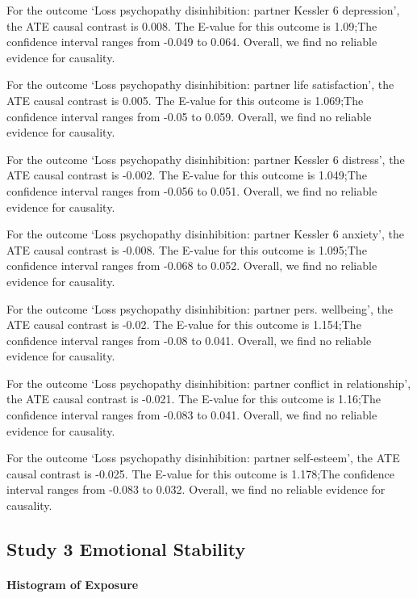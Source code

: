 \documentclass[
  singlecolumn]{article}
\let\oldparagraph\paragraph
\renewcommand{\paragraph}[1]{\oldparagraph{#1}\mbox{}}
\begin{document}
For the outcome `Loss psychopathy disinhibition: partner Kessler 6
depression', the ATE causal contrast is 0.008. The E-value for this
outcome is 1.09;The confidence interval ranges from -0.049 to 0.064.
Overall, we find no reliable evidence for causality.

For the outcome `Loss psychopathy disinhibition: partner life
satisfaction', the ATE causal contrast is 0.005. The E-value for this
outcome is 1.069;The confidence interval ranges from -0.05 to 0.059.
Overall, we find no reliable evidence for causality.

For the outcome `Loss psychopathy disinhibition: partner Kessler 6
distress', the ATE causal contrast is -0.002. The E-value for this
outcome is 1.049;The confidence interval ranges from -0.056 to 0.051.
Overall, we find no reliable evidence for causality.

For the outcome `Loss psychopathy disinhibition: partner Kessler 6
anxiety', the ATE causal contrast is -0.008. The E-value for this
outcome is 1.095;The confidence interval ranges from -0.068 to 0.052.
Overall, we find no reliable evidence for causality.

For the outcome `Loss psychopathy disinhibition: partner pers.
wellbeing', the ATE causal contrast is -0.02. The E-value for this
outcome is 1.154;The confidence interval ranges from -0.08 to 0.041.
Overall, we find no reliable evidence for causality.

For the outcome `Loss psychopathy disinhibition: partner conflict in
relationship', the ATE causal contrast is -0.021. The E-value for this
outcome is 1.16;The confidence interval ranges from -0.083 to 0.041.
Overall, we find no reliable evidence for causality.

For the outcome `Loss psychopathy disinhibition: partner self-esteem',
the ATE causal contrast is -0.025. The E-value for this outcome is
1.178;The confidence interval ranges from -0.083 to 0.032. Overall, we
find no reliable evidence for causality.

\subsection{Study 3 Emotional
Stability}\label{study-3-emotional-stability}

\paragraph{Histogram of Exposure}\label{histogram-of-exposure-2}
\end{document}
